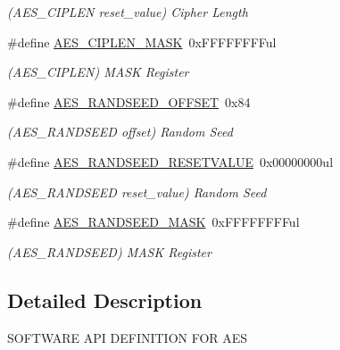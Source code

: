 \begin{DoxyCompactItemize}
\begin{DoxyCompactList}\small\item\em (A\+E\+S\+\_\+\+C\+I\+P\+L\+E\+N reset\+\_\+value) Cipher Length \end{DoxyCompactList}\item 
\hypertarget{group___s_a_m_l21___a_e_s_ga3d019b62fbb83ca231956680099ae1c5}{}\#define \hyperlink{group___s_a_m_l21___a_e_s_ga3d019b62fbb83ca231956680099ae1c5}{A\+E\+S\+\_\+\+C\+I\+P\+L\+E\+N\+\_\+\+M\+A\+S\+K}~0x\+F\+F\+F\+F\+F\+F\+F\+Ful\label{group___s_a_m_l21___a_e_s_ga3d019b62fbb83ca231956680099ae1c5}

\begin{DoxyCompactList}\small\item\em (A\+E\+S\+\_\+\+C\+I\+P\+L\+E\+N) M\+A\+S\+K Register \end{DoxyCompactList}\item 
\hypertarget{group___s_a_m_l21___a_e_s_ga66e87bea67036acb95cd23de742c0022}{}\#define \hyperlink{group___s_a_m_l21___a_e_s_ga66e87bea67036acb95cd23de742c0022}{A\+E\+S\+\_\+\+R\+A\+N\+D\+S\+E\+E\+D\+\_\+\+O\+F\+F\+S\+E\+T}~0x84\label{group___s_a_m_l21___a_e_s_ga66e87bea67036acb95cd23de742c0022}

\begin{DoxyCompactList}\small\item\em (A\+E\+S\+\_\+\+R\+A\+N\+D\+S\+E\+E\+D offset) Random Seed \end{DoxyCompactList}\item 
\hypertarget{group___s_a_m_l21___a_e_s_ga455525ebfad19c0e2ceb82ef10424d25}{}\#define \hyperlink{group___s_a_m_l21___a_e_s_ga455525ebfad19c0e2ceb82ef10424d25}{A\+E\+S\+\_\+\+R\+A\+N\+D\+S\+E\+E\+D\+\_\+\+R\+E\+S\+E\+T\+V\+A\+L\+U\+E}~0x00000000ul\label{group___s_a_m_l21___a_e_s_ga455525ebfad19c0e2ceb82ef10424d25}

\begin{DoxyCompactList}\small\item\em (A\+E\+S\+\_\+\+R\+A\+N\+D\+S\+E\+E\+D reset\+\_\+value) Random Seed \end{DoxyCompactList}\item 
\hypertarget{group___s_a_m_l21___a_e_s_gad290ffaf9510c1afd29efcbccd4768b1}{}\#define \hyperlink{group___s_a_m_l21___a_e_s_gad290ffaf9510c1afd29efcbccd4768b1}{A\+E\+S\+\_\+\+R\+A\+N\+D\+S\+E\+E\+D\+\_\+\+M\+A\+S\+K}~0x\+F\+F\+F\+F\+F\+F\+F\+Ful\label{group___s_a_m_l21___a_e_s_gad290ffaf9510c1afd29efcbccd4768b1}

\begin{DoxyCompactList}\small\item\em (A\+E\+S\+\_\+\+R\+A\+N\+D\+S\+E\+E\+D) M\+A\+S\+K Register \end{DoxyCompactList}\end{DoxyCompactItemize}


\subsection{Detailed Description}
S\+O\+F\+T\+W\+A\+R\+E A\+P\+I D\+E\+F\+I\+N\+I\+T\+I\+O\+N F\+O\+R A\+E\+S 